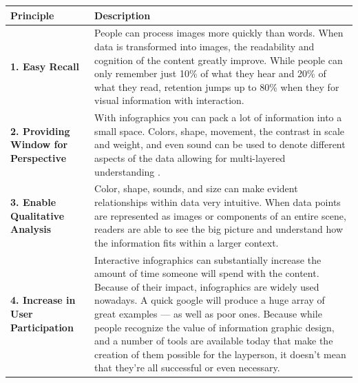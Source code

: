 \documentclass[]{book}
\theoremstyle{definition}
\theoremstyle{definition}
\theoremstyle{definition}
\theoremstyle{remark}
\begin{document}
\begin{longtable}[]{@{}ll@{}}
\toprule
\begin{minipage}[b]{0.16\columnwidth}\raggedright\strut
\textbf{Principle}\strut
\end{minipage} & \begin{minipage}[b]{0.78\columnwidth}\raggedright\strut
\textbf{Description}\strut
\end{minipage}\tabularnewline
\midrule
\endhead
\begin{minipage}[t]{0.16\columnwidth}\raggedright\strut
\textbf{1. Easy Recall}\strut
\end{minipage} & \begin{minipage}[t]{0.78\columnwidth}\raggedright\strut
People can process images more quickly than words. When data is
transformed into images, the readability and cognition of the content
greatly improve. While people can only remember just 10\% of what they
hear and 20\% of what they read, retention jumps up to 80\% when they
for visual information with interaction.\strut
\end{minipage}\tabularnewline
\begin{minipage}[t]{0.16\columnwidth}\raggedright\strut
\textbf{2. Providing Window for Perspective}\strut
\end{minipage} & \begin{minipage}[t]{0.78\columnwidth}\raggedright\strut
With infographics you can pack a lot of information into a small space.
Colors, shape, movement, the contrast in scale and weight, and even
sound can be used to denote different aspects of the data allowing for
multi-layered understanding \citep{image_good}.\strut
\end{minipage}\tabularnewline
\begin{minipage}[t]{0.16\columnwidth}\raggedright\strut
\textbf{3. Enable Qualitative Analysis}\strut
\end{minipage} & \begin{minipage}[t]{0.78\columnwidth}\raggedright\strut
Color, shape, sounds, and size can make evident relationships within
data very intuitive. When data points are represented as images or
components of an entire scene, readers are able to see the big picture
and understand how the information fits within a larger context.\strut
\end{minipage}\tabularnewline
\begin{minipage}[t]{0.16\columnwidth}\raggedright\strut
\textbf{4. Increase in User Participation}\strut
\end{minipage} & \begin{minipage}[t]{0.78\columnwidth}\raggedright\strut
Interactive infographics can substantially increase the amount of time
someone will spend with the content. Because of their impact,
infographics are widely used nowadays. A quick google will produce a
huge array of great examples --- as well as poor ones. Because while
people recognize the value of information graphic design, and a number
of tools are available today that make the creation of them possible for
the layperson, it doesn't mean that they're all successful or even
necessary.\strut
\end{minipage}\tabularnewline
\bottomrule
\end{longtable}
\end{document}
